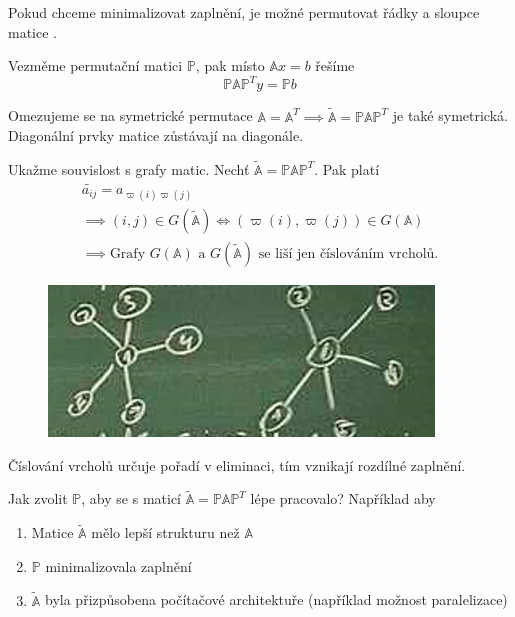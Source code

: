 \documentclass[../main.tex]{subfiles}
\begin{document}
Pokud chceme minimalizovat zaplnění, je možné permutovat řádky a sloupce matice \matA.

Vezměme permutační matici $\mathbb{P}$, pak místo $\mathbb{A}x=b$
řešíme \begin{equation*}
    \mathbb{P}\mathbb{A}\mathbb{P}^T y = \mathbb{P} b 
\end{equation*}


Omezujeme se na symetrické permutace
$\mathbb{A}=\mathbb{A}^T \implies \tilde{\mathbb{A}}= \mathbb{P}\mathbb{A}\mathbb{P}^T$ je také symetrická.
Diagonální prvky matice \matA zůstávají na diagonále.

Ukažme souvislost s grafy matic. Nechť $\tilde{\mathbb{A}}= \mathbb{P}\mathbb{A}\mathbb{P}^T$. Pak platí
\begin{multline*}
    \tilde{a_{ij}} = a_{\varpi(i)\varpi(j)}\\
    \implies  (i,j)\in G(\tilde{\mathbb{A}}) \Leftrightarrow (\varpi(i), \varpi(j))\in G(\mathbb{A})\\
    \implies \text{Grafy } G(\mathbb{A}) \text{ a } G(\tilde{\mathbb{A}}) \text{ se liší jen číslováním vrcholů.} 
\end{multline*}

\begin{figure}[H]
    \centering
    \includegraphics{images/26-10-cislovani.png}
\end{figure}
 Číslování vrcholů určuje pořadí v eliminaci, tím vznikají rozdílné zaplnění.



Jak zvolit $\mathbb{P}$, aby se s maticí 
$\tilde{\mathbb{A}}= \mathbb{P}\mathbb{A}\mathbb{P}^T$
lépe pracovalo? Například aby 
\begin{enumerate}
    \item Matice $\tilde{\mathbb{A}}$ mělo lepší strukturu než $\mathbb{A}$
    \item $\mathbb{P}$ minimalizovala zaplnění
    \item $\tilde{\mathbb{A}}$ byla přizpůsobena počítačové architektuře (například možnost paralelizace)
\end{enumerate}
\end{document}
